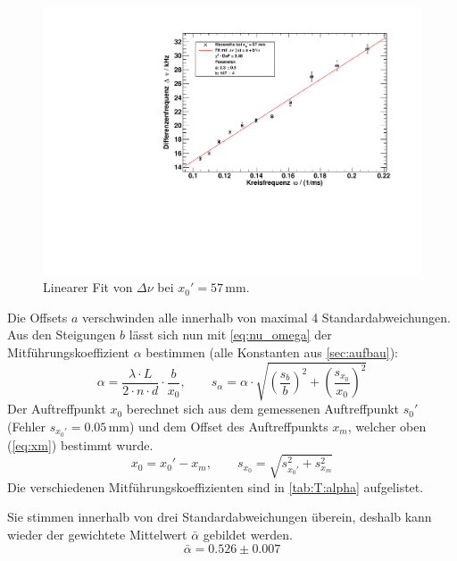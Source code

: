 \begin{figure}[H]
\begin{center}
  \includegraphics[width=\textwidth]{../img/fit_x0_57mm.pdf}
  \caption{Linearer Fit von $\Delta \nu$ bei $x_0' = 57$\,mm.}
  \label{img:fit:T:57mm}
\end{center}
\end{figure}



Die Offsets $a$ verschwinden alle innerhalb von maximal 4 Standardabweichungen. Aus den Steigungen $b$ lässt sich nun mit \autoref{eq:nu_omega} 
der Mitführungskoeffizient $\alpha$ bestimmen (alle Konstanten aus \autoref{sec:aufbau}):
\begin{equation}
  \alpha = \frac{\lambda \cdot L}{2 \cdot n \cdot d} \cdot \frac{b}{x_0}, \qquad
  s_\alpha = \alpha \cdot \sqrt{ \left( \frac{s_b}{b} \right)^2 + \left( \frac{s_{x_0}}{x_0} \right)^2 }
\end{equation}
Der Auftreffpunkt $x_0$ berechnet sich aus dem gemessenen Auftreffpunkt $s_0'$ (Fehler $s_{x_0'} = 0.05$\,mm) und dem 
Offset des Auftreffpunkts $x_m$, welcher oben (\autoref{eq:xm}) bestimmt wurde.
\begin{equation}
  x_0 = x_0' - x_m, \qquad s_{x_0} = \sqrt{s_{x_0'}^2 + s_{x_m}^2}
\end{equation}
Die verschiedenen Mitführungskoeffizienten sind in \autoref{tab:T:alpha} aufgelistet.

Sie stimmen innerhalb von drei Standardabweichungen überein, deshalb kann wieder der gewichtete Mittelwert $\bar{\alpha}$ gebildet werden.
\begin{equation}
  \bar{\alpha} = 0.526 \pm 0.007
\end{equation}

